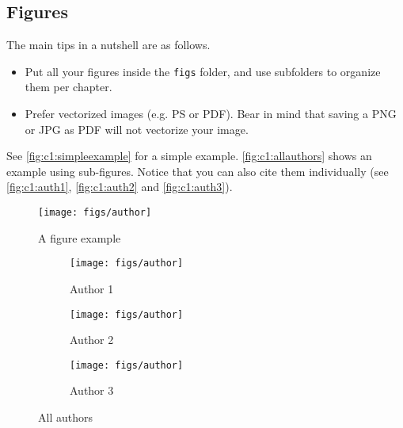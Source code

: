 \subsection{Figures}
\label{sec:c1:latex_figures}

The main tips in a nutshell are as follows.
\begin{itemize}
    \item Put all your figures inside the \texttt{figs} folder,
          and use subfolders to organize them per chapter.
    \item Prefer vectorized images (e.g. PS or PDF).
          Bear in mind that saving a PNG or JPG as PDF
          will not vectorize your image.
\end{itemize}

See \autoref{fig:c1:simpleexample} for a simple example.
\autoref{fig:c1:allauthors} shows an example using sub-figures.
Notice that you can also cite them individually
(see \autoref{fig:c1:auth1}, \autoref{fig:c1:auth2} and \autoref{fig:c1:auth3}).

\begin{figure}
    \centering
    \texttt{[image: figs/author]}
    \caption{A figure example}
    \label{fig:c1:simpleexample}
\end{figure}

\begin{figure}
    \centering
    \begin{subfigure}[b]{0.2\textwidth}
        \centering
        \texttt{[image: figs/author]}
        \caption{Author 1}
        \label{fig:c1:auth1}
    \end{subfigure}
    \hfill
    \begin{subfigure}[b]{0.2\textwidth}
        \centering
        \texttt{[image: figs/author]}
        \caption{Author 2}
        \label{fig:c1:auth2}
    \end{subfigure}
    \hfill
    \begin{subfigure}[b]{0.2\textwidth}
        \centering
        \texttt{[image: figs/author]}
        \caption{Author 3}
        \label{fig:c1:auth3}
    \end{subfigure}
       \caption{All authors}
       \label{fig:c1:allauthors}
\end{figure}
